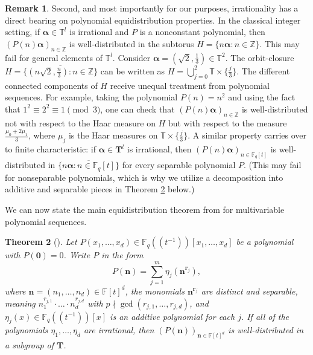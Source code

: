 \documentclass{amsart}
\newtheorem{theorem}{Theorem}[section]
\theoremstyle{definition}
\newtheorem{remark}[theorem]{Remark}
\numberwithin{equation}{section}
\newcommand{\Z}{\mathbb{Z}}
\newcommand{\T}{\mathbb{T}}
\newcommand{\F}{\mathbb{F}}
\begin{document}
\begin{remark}
    Second, and most importantly for our purposes, irrationality has a direct bearing on polynomial equidistribution properties.
    In the classical integer setting, if $\bm{\alpha} \in \T^l$ is irrational and $P$ is a nonconstant polynomial, then $(P(n)\bm{\alpha})_{n \in \Z}$ is well-distributed in the subtorus $H = \overline{\{n\bm{\alpha} : n \in \Z\}}$.
    This may fail for general elements of $\T^l$.
    Consider $\bm{\alpha} = (\sqrt{2}, \frac{1}{3}) \in \T^2$.
    The orbit-closure $H = \overline{\{(n\sqrt{2}, \frac{n}{3}) : n \in \Z\}}$ can be written as $H = \bigcup_{j=0}^2 \T \times \{\frac{j}{3}\}$.
    The different connected components of $H$ receive unequal treatment from polynomial sequences.
    For example, taking the polynomial $P(n) = n^2$ and using the fact that $1^2 \equiv 2^2 \equiv 1 \pmod{3}$, one can check that $(P(n)\bm{\alpha})_{n \in \Z}$ is well-distributed not with respect to the Haar measure on $H$ but with respect to the measure $\frac{\mu_0 + 2\mu_1}{3}$, where $\mu_j$ is the Haar measures on $\T \times \{\frac{j}{3}\}$.
    A similar property carries over to finite characteristic: if $\bm{\alpha} \in \mathbf{T}^l$ is irrational, then $(P(n)\bm{\alpha})_{n \in \F_q[t]}$ is well-distributed in $\overline{\{n\bm{\alpha} : n \in \F_q[t]\}}$ for every separable polynomial $P$.
    (This may fail for nonseparable polynomials, which is why we utilize a decomposition into additive and separable pieces in Theorem \ref{thm: multivariable equidistribution} below.)
\end{remark}

We can now state the main equidistribution theorem from \cite{bl} for multivariable polynomial sequences.

\begin{theorem}[{\cite[Theorem 10.1]{bl}}] \label{thm: multivariable equidistribution}
    Let $P(x_1, \ldots, x_d) \in \F_q((t^{-1}))[x_1, \ldots, x_d]$ be a polynomial with $P(\bm{0}) = 0$.
    Write $P$ in the form
    \begin{equation*}
        P(\bm{n}) = \sum_{j=1}^m \eta_j(\bm{n}^{\bm{r}_j}),
    \end{equation*}
    where $\bm{n} = (n_1, \ldots, n_d) \in \F[t]^d$, the monomials $\bm{n}^{\bm{r}_j}$ are distinct and separable, meaning $n_1^{r_{j,1}} \cdot \ldots \cdot n_d^{r_{j,d}}$ with $p \nmid \gcd(r_{j,1}, \ldots, r_{j,d})$, and $\eta_j(x) \in \F_q((t^{-1}))[x]$ is an additive polynomial for each $j$.
    If all of the polynomials $\eta_1, \ldots, \eta_d$ are irrational, then $(P(\bm{n}))_{\bm{n} \in \F[t]^d}$ is well-distributed in a subgroup of $\mathbf{T}$.
\end{theorem}
\end{document}
